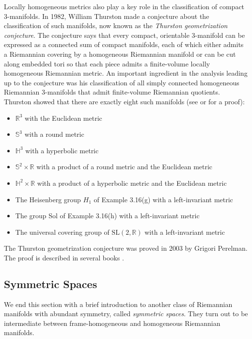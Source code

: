 Locally homogeneous metrics also play a key role in the classification of compact 3-manifolds. In 1982, William Thurston made a conjecture about the classification of such manifolds, now known as the \emph{Thurston geometrization conjecture}. The conjecture says that every compact, orientable 3-manifold can be expressed as a connected sum of compact manifolds, each of which either admits a Riemannian covering by a homogeneous Riemannian manifold or can be cut along embedded tori so that each piece admits a finite-volume locally homogeneous Riemannian metric. An important ingredient in the analysis leading up to the conjecture was his classification of all simply connected homogeneous Riemannian 3-manifolds that admit finite-volume Riemannian quotients. Thurston showed that there are exactly eight such manifolds (see \cite{Thu97} or \cite{Sco83} for a proof):

\begin{itemize}
\item $\mathbb{R}^3$ with the Euclidean metric
\item $\mathbb{S}^3$ with a round metric
\item $\mathbb{H}^3$ with a hyperbolic metric
\item $\mathbb{S}^2 \times \mathbb{R}$ with a product of a round metric and the Euclidean metric
\item $\mathbb{H}^2 \times \mathbb{R}$ with a product of a hyperbolic metric and the Euclidean metric
\item The Heisenberg group $H_1$ of Example 3.16(g) with a left-invariant metric
\item The group Sol of Example 3.16(h) with a left-invariant metric
\item The universal covering group of $\text{SL}(2, \mathbb{R})$ with a left-invariant metric
\end{itemize}

The Thurston geometrization conjecture was proved in 2003 by Grigori Perelman. The proof is described in several books \cite[KL08,MF10,MT14]{BBBMP}.

\subsection{Symmetric Spaces}

We end this section with a brief introduction to another class of Riemannian manifolds with abundant symmetry, called \emph{symmetric spaces}. They turn out to be intermediate between frame-homogeneous and homogeneous Riemannian manifolds.

